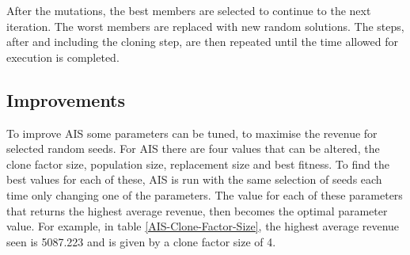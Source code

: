 \documentclass{article}
\begin{document}
After the mutations, the best members are selected to continue to the next iteration. The worst members are replaced with new random solutions. The steps, after and including the cloning step, are then repeated until the time allowed for execution is completed.

\subsection{Improvements}

To improve AIS some parameters can be tuned, to maximise the revenue for selected random seeds. For AIS there are four values that can be altered, the clone factor size, population size, replacement size and best fitness. To find the best values for each of these, AIS is run with the same selection of seeds each time only changing one of the parameters. The value for each of these parameters that returns the highest average revenue, then becomes the optimal parameter value. For example, in table \ref{AIS-Clone-Factor-Size}, the highest average revenue seen is 5087.223 and is given by a clone factor size of 4.
\end{document}
